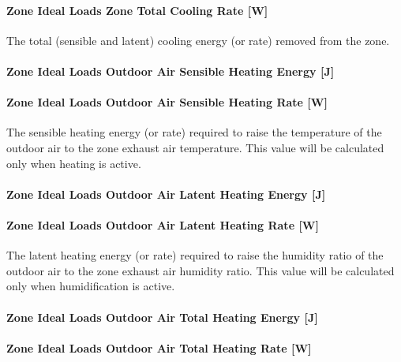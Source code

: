 \paragraph{Zone Ideal Loads Zone Total Cooling Rate {[}W{]}}\label{zone-ideal-loads-zone-total-cooling-rate-w}

The total (sensible and latent) cooling energy (or rate) removed from the zone.

\paragraph{Zone Ideal Loads Outdoor Air Sensible Heating Energy {[}J{]}}\label{zone-ideal-loads-outdoor-air-sensible-heating-energy-j}

\paragraph{Zone Ideal Loads Outdoor Air Sensible Heating Rate {[}W{]}}\label{zone-ideal-loads-outdoor-air-sensible-heating-rate-w}

The sensible heating energy (or rate) required to raise the temperature of the outdoor air to the zone exhaust air temperature. This value will be calculated only when heating is active.

\paragraph{Zone Ideal Loads Outdoor Air Latent Heating Energy {[}J{]}}\label{zone-ideal-loads-outdoor-air-latent-heating-energy-j}

\paragraph{Zone Ideal Loads Outdoor Air Latent Heating Rate {[}W{]}}\label{zone-ideal-loads-outdoor-air-latent-heating-rate-w}

The latent heating energy (or rate) required to raise the humidity ratio of the outdoor air to the zone exhaust air humidity ratio. This value will be calculated only when humidification is active.

\paragraph{Zone Ideal Loads Outdoor Air Total Heating Energy {[}J{]}}\label{zone-ideal-loads-outdoor-air-total-heating-energy-j}

\paragraph{Zone Ideal Loads Outdoor Air Total Heating Rate {[}W{]}}\label{zone-ideal-loads-outdoor-air-total-heating-rate-w}

